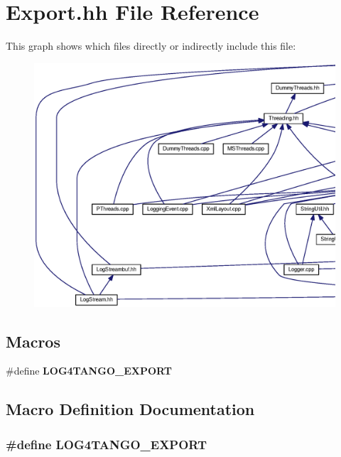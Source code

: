 \section{Export.\-hh File Reference}
\label{Export_8hh}
This graph shows which files directly or indirectly include this file\-:
\nopagebreak
\begin{figure}[H]
\begin{center}
\leavevmode
\includegraphics[width=350pt]{d7/d55/Export_8hh__dep__incl}
\end{center}
\end{figure}
\subsection*{Macros}
\begin{DoxyCompactItemize}
\item 
\#define {\bf L\-O\-G4\-T\-A\-N\-G\-O\-\_\-\-E\-X\-P\-O\-R\-T}
\end{DoxyCompactItemize}


\subsection{Macro Definition Documentation}
\subsubsection[{L\-O\-G4\-T\-A\-N\-G\-O\-\_\-\-E\-X\-P\-O\-R\-T}]{\setlength{\rightskip}{0pt plus 5cm}\#define L\-O\-G4\-T\-A\-N\-G\-O\-\_\-\-E\-X\-P\-O\-R\-T}\label{Export_8hh_abb9e874b4244b6247ac9dbb62a2c7b8f}
